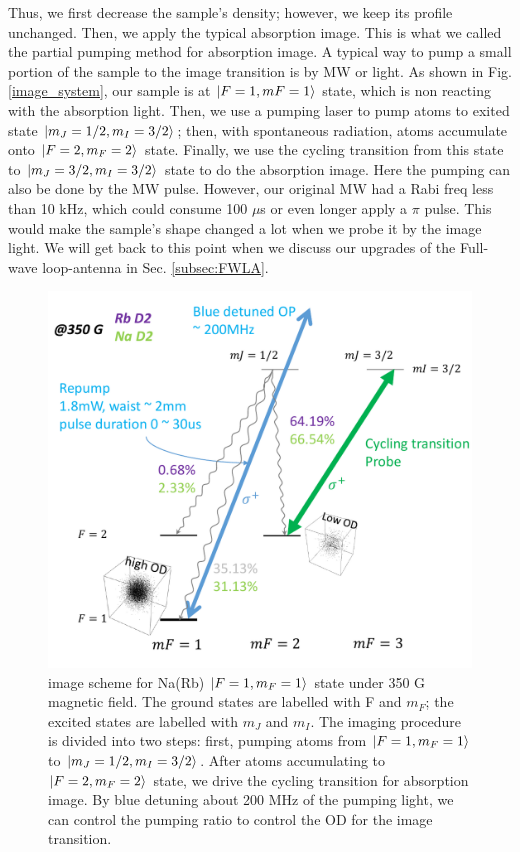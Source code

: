 Thus, we first decrease the sample's density; however, we keep its profile unchanged. Then, we apply the typical absorption image. This is what we called the partial pumping method for absorption image. A typical way to pump a small portion of the sample to the image transition is by MW or light. As shown in Fig. \ref{image_system}, our sample is at $\ket{F=1,mF=1}$ state, which is non reacting with the absorption light. Then, we use a pumping laser to pump atoms to exited state $\ket{m_J=1/2,m_I=3/2}$; then, with spontaneous radiation, atoms accumulate onto $\ket{F=2,m_F=2}$ state. Finally, we use the cycling transition from this state to $\ket{m_J=3/2,m_I=3/2}$ state to do the absorption image. Here the pumping can also be done by the MW pulse. However, our original MW had a Rabi freq less than 10 kHz, which could consume 100 $\mu$s or even longer apply a $\pi$ pulse. This would make the sample's shape changed a lot when we probe it by the image light. We will get back to this point when we discuss our upgrades of the Full-wave loop-antenna in Sec. \ref{subsec:FWLA}. 

\begin{figure}[htbp]
\begin{center}
\includegraphics[width = 0.8\linewidth]{figures/High-field image scheme.pdf}
\end{center}
\caption[image scheme for Na(Rb) $\ket{F=1,m_F=1}$ state under 350 G magnetic field]{image scheme for Na(Rb) $\ket{F=1,m_F=1}$ state under 350 G magnetic field. The ground states are labelled with F and $m_F$; the excited states are labelled with $m_J$ and $m_I$. The imaging procedure is divided into two steps: first, pumping atoms from $\ket{F=1,m_F=1}$ to $\ket{m_J=1/2,m_I=3/2}$. After atoms accumulating to $\ket{F=2,m_F=2}$ state, we drive the cycling transition for absorption image. By blue detuning about 200 MHz of the pumping light, we can control the pumping ratio to control the OD for the image transition.}
\label{High-field image sheme}
\end{figure}

